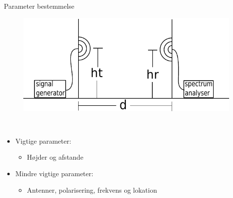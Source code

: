 \begin{frame}{Parameter bestemmelse}
\begin{figure}[!htbp]
	\centering
	\includegraphics[width = 0.8\columnwidth]{figures/setup.pdf}
\end{figure}
\begin{minipage}{0.15\textwidth}
 \textcolor{white}{.}  
\end{minipage}%
\begin{minipage}{0.8\textwidth}
\begin{itemize}
\item Vigtige parameter:
\begin{itemize}
\item Højder og afstande
\end{itemize}
\item Mindre vigtige parameter:
\begin{itemize}
\item Antenner, polarisering, frekvens og lokation
\end{itemize}
\end{itemize}
\end{minipage}
\end{frame}

